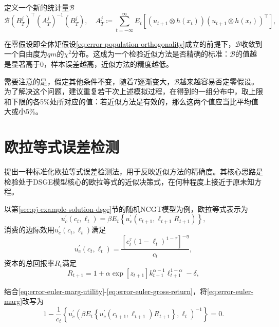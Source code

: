 定义一个新的统计量$\mathcal{B}$
\begin{equation}
  \label{eq:error-sample-static}
    \mathcal{B} \left( B_{T}^{j} \right)^{\top} \left(A_{T}^{j} \right)^{-1} \left( B_{T}^{j} \right), \quad  A_{T}^{j} \coloneqq \sum_{t=-\infty}^{\infty} E_{t}
    \left[
    \left( u_{t+1} \otimes h \left( x_t \right) \right)
    \left( u_{t+1} \otimes h \left( x_t \right) \right)^{\top}
    \right],
\end{equation}

在零假设即全体矩假设\eqref{eq:error-population-orthogonality}成立的前提下，$\mathcal{B}$收敛到一个自由度为$qm$的$\chi^{2}$分布。这成为一个检验近似方法是否精确的标准：$\mathcal{B}$的值越是显著高于$0$，样本误差越高，近似方法的精度越低。

需要注意的是，假定其他条件不变，随着$T$逐渐变大，$\mathcal{B}$越来越容易否定零假设。为了解决这个问题，\cite{denHaan:1990bt}建议重复若干次上述模拟过程，在得到的一组分布中，取上限和下限的各5\%处所对应的值：若近似方法是有效的，那么这两个值应当比平均值大或小5\%。

\section{欧拉等式误差检测}
\label{sec:error-euler-test}
\cite{Judd:1992gs}提出一种标准化欧拉等式误差检测法，用于反映近似方法的精确度。其核心思路是检验处于DSGE模型核心的欧拉等式的近似决策式，在何种程度上接近于原未知方程。

以第\ref{sec:pj-example-solution-dsge}节的随机NCGT模型为例，欧拉等式表示为
\begin{equation}
  \label{eq:error-euler-marg}
  u_{c}^{'} \left(c_{t}, \ell_{t} \right) = \beta E_{t}
  \left\{
  u_{c}^{'} \left( c_{t+1}, \ell_{t+1} R_{t+1} \right)
  \right\},
\end{equation}
消费的边际效用$u_{c}^{'} \left( c_{t}, \ell_{t} \right)$满足
\begin{equation}
  \label{eq:error-euler-marg-utility}
  u_{c}^{'} \left( c_{t}, \ell_{t} \right) = \frac{
  \left[
  c_{t}^{\tau} \left( 1 - \ell_{t} \right)^{1 - \tau}
  \right]^{- \eta}
  }{
  c_{t}
  },
\end{equation}
资本的总回报率$R_{t}$满足
\begin{equation}
  \label{eq:error-euler-gross-return}
  R_{t+1} =
  1 + \alpha \exp \left[ z_{t+1} \right]
  k_{t+1}^{\alpha - 1} \ell_{t+1}^{1 - \alpha} - \delta,
\end{equation}

结合\eqref{eq:error-euler-marg-utility}-\eqref{eq:error-euler-gross-return}，将\eqref{eq:error-euler-marg}改写为
\begin{equation}
  \label{eq:error-euler-marg-approx}
  1 - \frac{1}{c_{t}}
  \left\{
  u_{c}^{'}
  \left(
  \beta E_{t} \left\{ u_{c}^{'} \left(c_{t+1}, \ell_{t+1} \right) R_{t+1} \right\}, \ell_{t}
  \right)^{-1}
  \right\} = 0.
\end{equation}

